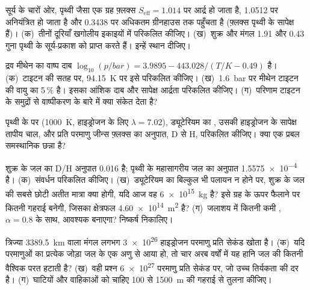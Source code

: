 \begin{exercise}[$\star$]\label{exo:b3:planetary-atmospheres:3}
सूर्य के चारों ओर, पृथ्वी जैसा एक ग्रह फ़्लक्स $S_\mathrm{eff}
= 1.014$ पर आर्द्र हो जाता है, 1.0512 पर अनियंत्रित हो जाता है और 0.3438 पर अधिकतम ग्रीनहाउस तक पहुँचता है
(फ़्लक्स पृथ्वी के सापेक्ष हैं)। (क)~तीनों दूरियाँ
खगोलीय इकाइयों में परिकलित कीजिए। (ख)~शुक्र और मंगल 1.91 और 0.43
गुना पृथ्वी के सूर्य-प्रकाश को प्राप्त करते हैं। इन्हें स्थान दीजिए।
\end{exercise}

\begin{exercise}[$\star$]\label{exo:b3:planetary-atmospheres:4}
द्रव मीथेन का वाष्प दाब $\log_{10}(p/\unit{bar}) = 3.9895 -
443.028/(T/\unit{K} - 0.49)$ है। (क)~टाइटन की सतह पर,
\qty{94.15}{K} पर इसे परिकलित कीजिए। (ख)~\qty{1.6}{bar} पर मीथेन टाइटन की वायु का 5\,\% है।
इसका आंशिक दाब और सापेक्ष आर्द्रता परिकलित कीजिए। (ग)~परिणाम
टाइटन के समुद्रों से वाष्पीकरण के बारे में क्या संकेत देता है?
\end{exercise}

\begin{exercise}[$\star\star$]\label{exo:b3:planetary-atmospheres:5}
पृथ्वी के  पर (\qty{1000}{K}, हाइड्रोजन के लिए $\lambda = 7.02$),
ड्यूटेरियम का , उसकी हाइड्रोजन के सापेक्ष तापीय चाल,
और प्रति परमाणु जीन्स फ़्लक्स का अनुपात, D से H, परिकलित कीजिए। क्या  एक प्रबल समस्थानिक छन्ना है?
\end{exercise}

\begin{exercise}[$\star\star$]\label{exo:b3:planetary-atmospheres:6}
शुक्र के जल का D/H अनुपात \num{0.016} है; पृथ्वी के महासागरीय जल का
अनुपात \num{1.5575e-4} है। (क)~संवर्धन परिकलित कीजिए। (ख)~ड्यूटेरियम का बिल्कुल भी
पलायन न होने पर, शुक्र के जल की सबसे छोटी अतीत मात्रा क्या होगी, यदि आज वह \qty{6e15}{kg} है?
इसे ग्रह के ऊपर फैलाने पर कितनी गहराई बनेगी,
जिसका क्षेत्रफल \qty{4.60e14}{m^2} है? (ग)~जलाशय में कितनी कमी
, $\alpha = 0.8$ के साथ, आवश्यक बनाएगा? निष्कर्ष निकालिए।
\end{exercise}

\begin{exercise}[$\star\star$]\label{exo:b3:planetary-atmospheres:7}
त्रिज्या \qty{3389.5}{km} वाला मंगल लगभग \num{3e26} हाइड्रोजन परमाणु
प्रति सेकंड खोता है। (क)~यदि परमाणुओं का प्रत्येक जोड़ा जल के एक अणु से आया हो, तो
चार अरब वर्षों में यह हानि जल की कितनी वैश्विक परत हटाती है?
(ख)~वही प्रश्न \num{6e27} परमाणु प्रति सेकंड पर, जो उच्च
तिर्यकता की दर है। (ग)~घाटियों और वाहिकाओं को चाहिए 100 से \qty{1500}{m} की
गहराई से तुलना कीजिए।
\end{exercise}

